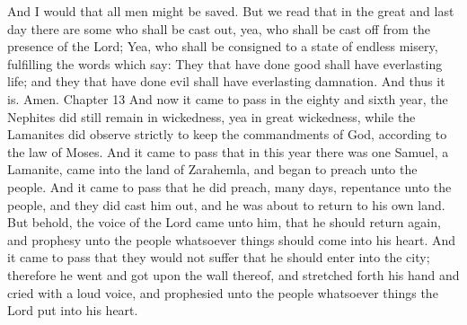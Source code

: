 And I would that all men might be saved. But we read that in the great and last day there are some who shall be cast out, yea, who shall be cast off from the presence of the Lord;
\bverse \iffalse Yea, who shall be consigned to a state of endless misery, fulfilling the words which say: They that have done good shall have everlasting life; and they that have done evil shall have everlasting damnation. And thus it is. Amen. \fi
Yea, who shall be consigned to a state of endless misery, fulfilling the words which say: They that have done good shall have everlasting life; and they that have done evil shall have everlasting damnation. And thus it is. Amen.
Chapter 13
\bchapter
\bverse \iffalse And now it came to pass in the eighty and sixth year, the Nephites did still remain in wickedness, yea in great wickedness, while the Lamanites did observe strictly to keep the commandments of God, according to the law of Moses. \fi
And now it came to pass in the eighty and sixth year, the Nephites did still remain in wickedness, yea in great wickedness, while the Lamanites did observe strictly to keep the commandments of God, according to the law of Moses.
\bverse \iffalse And it came to pass that in this year there was one Samuel, a Lamanite, came into the land of Zarahemla, and began to preach unto the people. And it came to pass that he did preach, many days, repentance unto the people, and they did cast him out, and he was about to return to his own land. \fi
And it came to pass that in this year there was one Samuel, a Lamanite, came into the land of Zarahemla, and began to preach unto the people. And it came to pass that he did preach, many days, repentance unto the people, and they did cast him out, and he was about to return to his own land.
\bverse \iffalse But behold, the voice of the Lord came unto him, that he should return again, and prophesy unto the people whatsoever things should come into his heart. \fi
But behold, the voice of the Lord came unto him, that he should return again, and prophesy unto the people whatsoever things should come into his heart.
\bverse \iffalse And it came to pass that they would not suffer that he should enter into the city; therefore he went and got upon the wall thereof, and stretched forth his hand and cried with a loud voice, and prophesied unto the people whatsoever things the Lord put into his heart. \fi
And it came to pass that they would not suffer that he should enter into the city; therefore he went and got upon the wall thereof, and stretched forth his hand and cried with a loud voice, and prophesied unto the people whatsoever things the Lord put into his heart.

